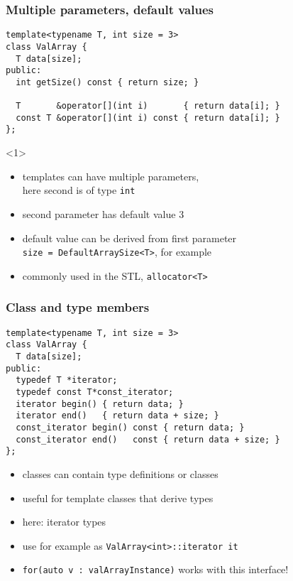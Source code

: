 \documentclass{slides}
\begin{document}
\begin{frame}[fragile]
  \frametitle{Multiple parameters, default values}

\begin{lstlisting}
template<typename T, int size = 3>
class ValArray {
  T data[size];
public:
  int getSize() const { return size; }

  T       &operator[](int i)       { return data[i]; }
  const T &operator[](int i) const { return data[i]; }
};
\end{lstlisting}

  \begin{onlyenv}<1>
    \begin{itemize}
    \item templates can have multiple parameters,\\
      here second is of type \lstinline!int!
    \item second parameter has default value 3
    \item default value can be derived from first parameter\\
      \lstinline!size = DefaultArraySize<T>!, for example
    \item commonly used in the STL, \lstinline!allocator<T>!
    \end{itemize}
  \end{onlyenv}
\end{frame}

\begin{frame}[fragile]
  \frametitle{Class and type members}

\begin{lstlisting}[emph={typedef}]
template<typename T, int size = 3>
class ValArray {
  T data[size];
public:
  typedef T *iterator;
  typedef const T*const_iterator;
  iterator begin() { return data; }
  iterator end()   { return data + size; }
  const_iterator begin() const { return data; }
  const_iterator end()   const { return data + size; }
};
\end{lstlisting}

  \begin{itemize}
  \item classes can contain type definitions or classes
  \item useful for template classes that derive types
  \item here: iterator types
  \item use for example as \lstinline!ValArray<int>::iterator it!
  \item \lstinline!for(auto v : valArrayInstance)! works with this interface!
  \end{itemize}

\end{frame}
\end{document}
